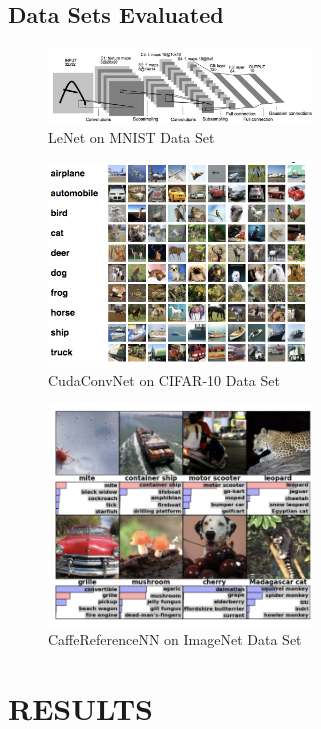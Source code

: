 \documentclass[letterpaper, 10 pt, conference]{ieeeconf}
\begin{document}
  \subsection{Data Sets Evaluated}

          \begin{figure}[h]
              \centering
              \includegraphics[width=70mm,scale=1]{lenet_ds}
              \caption{LeNet on MNIST Data Set}
              \label{fig:lenet_ds}
          \end{figure}
          \begin{figure}[h]
              \centering
              \includegraphics[width=70mm,scale=1]{cifar10_ds}
              \caption{CudaConvNet on CIFAR-10 Data Set}
              \label{cifar10_ds}
          \end{figure}
          \begin{figure}[h]
              \centering
              \includegraphics[width=70mm,scale=1]{imagenet_ds}
              \caption{CaffeReferenceNN on ImageNet Data Set}
              \label{imagenet_ds}
          \end{figure}


\section{RESULTS}
\end{document}
